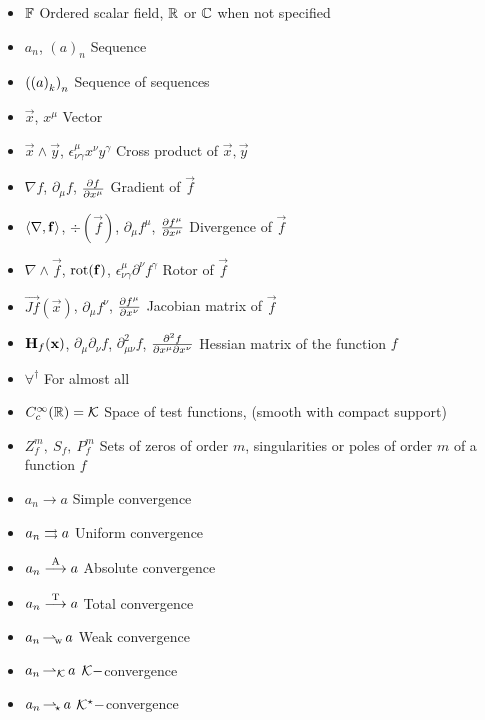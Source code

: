 \documentclass[../complete.tex]{subfiles}
\begin{document}
\begin{itemize}
\item $\mathbb{F}$ Ordered scalar field, $\mathbb{R}$ or $\mathbb{C}$ when not specified
\item $a_n$, $(a)_n$ Sequence
\item $\left(\left(a\right)_{k}\right)_{n}$ Sequence of sequences
\item $\vec{x}$, $x^\mu$ Vector
\item $\vec{x}\wedge\vec{y}$, $\epsilon^\mu_{\nu\gamma}x^\nu y^\gamma$ Cross product of $\vec{x},\vec{y}$
\item $\nabla f$, $\partial_\mu f$, $\pdv{f}{x^\mu}$ Gradient of $\vec{f}$
\item $\langle \nabla, \mathbf{f} \rangle$, $\div(\vec{f})$, $\partial_\mu f^\mu$, $\pdv{f^\mu}{x^\mu}$ Divergence of $\vec{f}$
\item $\nabla\wedge\vec{f}$, $\operatorname{rot}(\mathbf{f})$, $\epsilon^\mu_{\nu\gamma}\partial^\nu f^\gamma$ Rotor of $\vec{f}$
\item $\vec{Jf}(\vec{x})$, $\partial_\mu f^\nu$, $\pdv{f^\mu}{x^\nu}$ Jacobian matrix of $\vec{f}$
\item $\mathbf{H}_{f}(\mathbf{x})$, $\partial_\mu\partial_\nu f$, $\partial^2_{\mu\nu}f$, $\pdv[2]{f}{x^\mu}{x^\nu}$ Hessian matrix of the function $f$
\item $\forall^{\dagger}$ For almost all
\item $C_c^\infty(\mathbb{R})=\mathcal{K}$ Space of test functions, (smooth with compact support)
\item $Z_f^m,\ S_f,\ P_f^m$ Sets of zeros of order $m$, singularities or poles of order $m$ of a function $f$
\item $a_n\to a$ Simple convergence
\item $a_n\rightrightarrows a$ Uniform convergence
\item $a_n\overset{\mathrm{A}}{\longrightarrow} a$ Absolute convergence
\item $a_n\overset{\mathrm{T}}{\longrightarrow} a$ Total convergence
\item $a_n\operatorname{\rightharpoonup_{\! w}} a$ Weak convergence
\item $a_n\operatorname{\rightharpoonup_{\mathcal{K}}} a$ $\mathcal{K}-$convergence
\item $a_n\operatorname{\rightharpoonup_{\!\star}} a$ $\mathcal{K}^\star-$convergence
\end{itemize}
\end{document}
